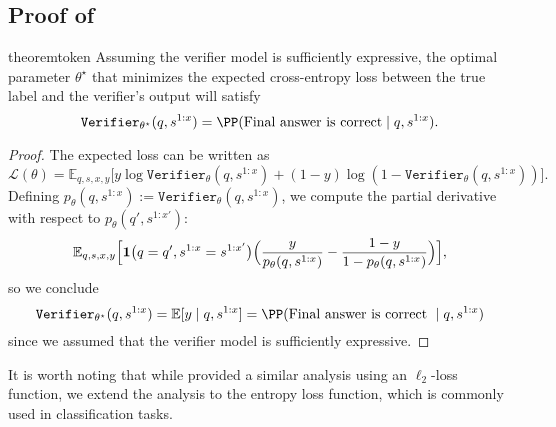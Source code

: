 \subsection{Proof of }
\begin{restatable}{theorem}{token}
\label{obs:token-wise-training}
Assuming the verifier model is sufficiently expressive, the optimal parameter \( \theta^\star \) that minimizes the expected cross-entropy loss between the true label and the verifier's output will satisfy  
\[
\texttt{Verifier}_{\theta^\star}(q, s^{1:x}) = \PP(\text{Final answer is correct} \mid q, s^{1:x}).
\]
\end{restatable}
\begin{proof}
The expected loss can be written as
\[
   \mathcal{L}(\theta)
   =
   \mathbb{E}_{q, s, x, y}
   \Big[
     y \log \texttt{Verifier}_{\theta}(q, s^{1:x})
     +
     (1-y) \log (1 - \texttt{Verifier}_{\theta}(q, s^{1:x}))
   \Big].
\]
Defining $p_{\theta}(q, s^{1:x}) := \texttt{Verifier}_{\theta}(q, s^{1:x})$, we compute the partial derivative with respect to \( p_{\theta}(q', s^{1:x'}) \):
\[
     \mathbb{E}_{q, s, x, y} \Bigl[
       \mathbf{1}\bigl(q=q', s^{1:x}=s^{1:x'}\bigr)
         \Bigl(\frac{y}{p_{\theta}(q,s^{1:x})}
               -
               \frac{1-y}{1 - p_{\theta}(q,s^{1:x})}
         \Bigr)
     \Bigr],
\]
so we conclude 
\[
     \texttt{Verifier}_{\theta^\star}(q, s^{1:x}) = \mathbb{E}[y \mid q, s^{1:x}] = \PP(\text{Final answer is correct }\mid q, s^{1:x})
\]
since we assumed that the verifier model is sufficiently expressive.
\end{proof}
{It is worth noting that while \citet{yu2023outcome} provided a similar analysis using an \( \ell_2 \)-loss function, we extend the analysis to the entropy loss function, which is commonly used in classification tasks.}
